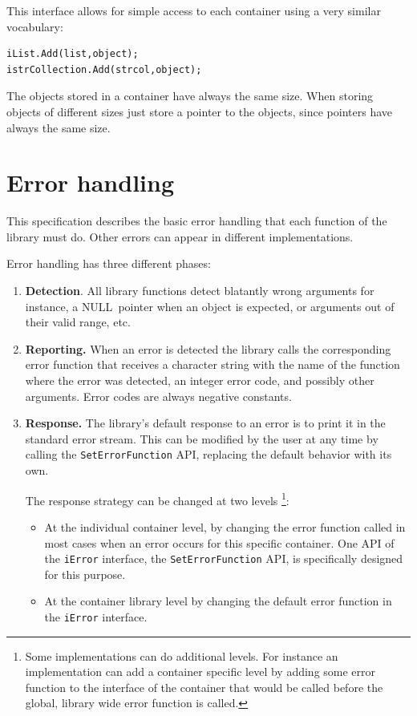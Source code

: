 \documentclass[12pt,a4paper]{memoir} %
\newif\iftth
\newenvironment{ShorterItemize}{
\begin{itemize}
\iftth\else
  \setlength{\itemsep}{1pt}
  \setlength{\parskip}{0pt}
  \setlength{\parsep}{0pt}
\fi
}{\end{itemize}
}
\newcommand{\Null}{{\iftth \ NULL \else \footnotesize NULL\  \fi}}
\begin{document}
This interface allows for simple access to each container using a very similar vocabulary:
\begin{verbatim}
iList.Add(list,object);
istrCollection.Add(strcol,object);
\end{verbatim}
The objects stored in a container have always the same size. When storing objects of different sizes just store a pointer to the objects, since pointers have always the same size.
\section{Error handling}
This specification describes the basic error handling that each function of the library must do. Other errors can appear in different implementations.

Error handling has three different phases:
\begin{enumerate}
\item \textbf{Detection}. All library functions detect blatantly wrong arguments for instance, a \Null pointer when an object is expected, or arguments out of their valid range, etc.
\item \textbf{Reporting.} When an error is detected the library calls the corresponding error function that receives a character string with the name of the 
function where the error was detected, an integer error code, and possibly other arguments. Error codes are always negative constants.
\item \textbf{Response.} The library's default response to an error is to print it in the standard error stream. This can be modified by the user at any time by calling the \texttt{SetErrorFunction} API, replacing the default behavior with its own.

The response strategy can be changed at two levels \footnote
{Some implementations can do additional levels. For instance an implementation can add a container specific level by adding some error function
to the interface of the container that would be called before the global, library wide error function is called.}:
\begin{ShorterItemize}
\item At the individual container level, by changing the error function called in  most cases when an error occurs for this specific container. One API of the \verb,iError, interface, the \verb,SetErrorFunction, API, is specifically designed for this purpose.
\item At the container library level by changing the default error function in the \verb,iError, interface.
\end{ShorterItemize}

\end{enumerate}
\end{document}
